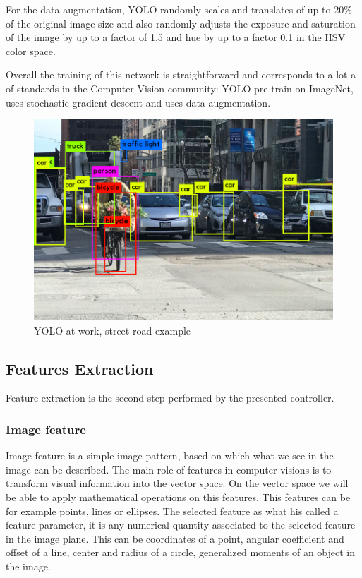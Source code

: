 For the data augmentation, YOLO randomly scales and translates of up to 20\% of the original image size and also randomly adjusts the exposure and saturation of the image by up to a
factor of 1.5 and hue by up to a factor 0.1 in the HSV color space.

Overall the training of this network is straightforward and corresponds to a lot a of standards in the Computer Vision community: YOLO pre-train on ImageNet, uses stochastic gradient descent and uses data augmentation.

\begin{figure} [!ht]
    \centering
    \includegraphics[width=0.65\linewidth]{images/yolo_example.png}
    \caption{YOLO at work, street road example}
    \label{pict:yolo_example}
\end{figure}


\newpage

\subsection{Features Extraction}

Feature extraction is the second step performed by the presented controller.

\subsubsection{Image feature}

Image feature is a simple image pattern, based on which what we see in the image can be described. The main role of features in computer visions is to transform visual information into the vector space. On the vector space we will be able to apply mathematical operations on this features.
This features can be for example points, lines or ellipses.
The selected feature as what his called a feature parameter, it is any numerical quantity associated to the selected feature in the image plane. This can be coordinates of a point, angular coefficient and offset of a line, center and radius of a circle, generalized moments of an object in the image.

